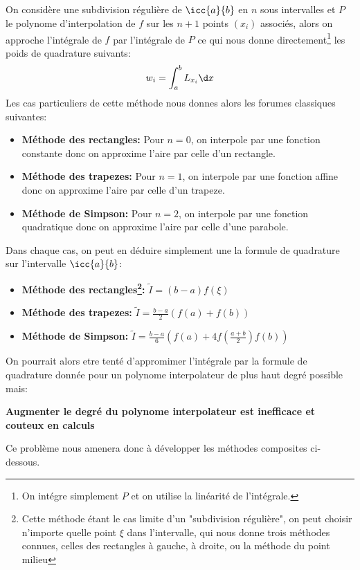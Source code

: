 \subsection*{}
On considère une subdivision régulière de \(\icc{a}{b}\) en \(n\) sous intervalles et \(P\) le polynome d'interpolation de \(f\) sur les \(n + 1\) points \((x_i)\) associés, alors on approche l'intégrale de \(f\) par l'intégrale de \(P\) ce qui nous donne directement\footnote[1]{On intégre simplement \(P\) et on utilise la linéarité de l'intégrale.} les poids de quadrature suivants:
\[
   w_i = \int_{a}^{b} L_{x_i} \d x
\]
Les cas particuliers de cette méthode nous donnes alors les forumes classiques suivantes:
\begin{itemize}
   \item \textbf{Méthode des rectangles:} Pour \(n = 0\), on interpole par une fonction constante donc on approxime l'aire par celle d'un rectangle.
   \item \textbf{Méthode des trapezes:} Pour \(n = 1\), on interpole par une fonction affine donc on approxime l'aire par celle d'un trapeze.   
   \item \textbf{Méthode de Simpson:} Pour \(n = 2\), on interpole par une fonction quadratique donc on approxime l'aire par celle d'une parabole.
\end{itemize}
Dans chaque cas, on peut en déduire simplement une la formule de quadrature sur l'intervalle \(\icc{a}{b}\):
\begin{itemize}
   \item \textbf{Méthode des rectangles\footnote[2]{Cette méthode étant le cas limite d'un "subdivision régulière", on peut choisir n'importe quelle point \(\xi\) dans l'intervalle, qui nous donne trois méthodes connues, celles des rectangles à gauche, à droite, ou la méthode du point milieu}:} \(\widetilde{I} = (b - a)f(\xi)\) 
   \item \textbf{Méthode des trapezes:} \(\widetilde{I} = \frac{b - a}{2}(f(a) + f(b))\) 
   \item \textbf{Méthode de Simpson:}  \(\widetilde{I} = \frac{b - a}{6}(f(a) + 4f(\frac{a + b}{2}) f(b))\) 
\end{itemize}
On pourrait alors etre tenté d'appromimer l'intégrale par la formule de quadrature donnée pour un polynome interpolateur de plus haut degré possible mais:
\begin{center}
   \textbf{Augmenter le degré du polynome interpolateur est inefficace et couteux en calculs }
\end{center}
Ce problème nous amenera donc à développer les méthodes composites ci-dessous.

